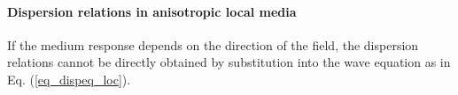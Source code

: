 \paragraph{Dispersion relations in anisotropic local media}  %
If the medium response depends on the direction of the field, the dispersion relations cannot be directly obtained by substitution into the wave equation as in Eq. (\ref{eq_dispeq_loc}).

